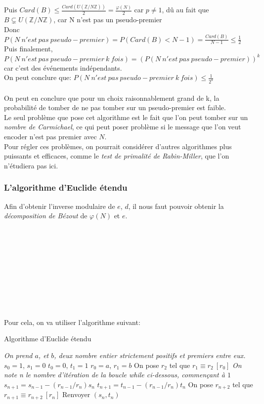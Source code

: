\documentclass[12 pt]{article}
\begin{document}
Puis $Card(B) \leq \frac{Card(U(\mathbb{Z} / N \mathbb{Z}))}{2} = \frac{\varphi(N)}{2}$ car $p \neq 1$, dû au fait que $B \subsetneq U(\mathbb{Z} / N \mathbb{Z})$, car N n'est pas un pseudo-premier\\
Donc $P(N~n'est~pas~pseudo-premier) = P(Card(B) < N-1) = \frac{Card(B)}{N-1} \leq \frac{1}{2}$\\
Puis finalement, $P(N~n'est~pas~pseudo-premier~k~fois) = (P(N~n'est~pas~pseudo-premier))^k$ car c'est des événements indépendants.\\
On peut conclure que: $P(N~n'est~pas~pseudo-premier~k~fois) \leq \frac{1}{2^k}$
\\\\
On peut en conclure que pour un choix raisonnablement grand de k, la probabilité de tomber de ne pas tomber sur un pseudo-premier est faible.\\
Le seul problème que pose cet algorithme est le fait que l'on peut tomber sur un \textit{nombre de Carmichael}, ce qui peut poser problème si le message que l'on veut encoder n'est pas premier avec $N$.\\
Pour régler ces problèmes, on pourrait considérer d'autres algorithmes plus puissants et efficaces, comme le \textit{test de primalité de Rabin-Miller}, que l'on n'étudiera pas ici.

\subsubsection{L'algorithme d'Euclide étendu}

Afin d'obtenir l'inverse modulaire de $e$, $d$, il nous faut pouvoir obtenir la \textit{décomposition de Bézout} de $\varphi(N)$ et $e$.\\\\\\\\\\\\\\\\\\\\\\
Pour cela, on va utiliser l'algorithme suivant:

\begin{algorithm}
	\caption{Algorithme d'Euclide étendu}
	\label{euclid}
	\begin{algorithmic}[1]
		\State \textit{On prend $a$, et $b$, deux nombre entier strictement positifs et premiers entre eux.}
		\State $s_0 = 1$, $s_1 = 0$
		\State $t_0 = 0$, $t_1 = 1$
		\State $r_0 = a$, $r_1 = b$
		\State On pose $r_2$ tel que $r_1 \equiv r_2~[r_0]$
		\State \textit{On note n le nombre d'itération de la boucle while ci-dessous, commençant à $1$}
		\State $s_{n+1} = s_{n-1} - (r_{n-1} / r_n)s_n$
		\State $t_{n+1} = t_{n-1} - (r_{n-1} / r_n)t_n$
		\State On pose $r_{n+2}$ tel que $r_{n+1} \equiv r_{n+2}~[r_n]$
		\EndWhile
		\State Renvoyer $(s_n, t_n)$
	\end{algorithmic}
\end{algorithm}
\end{document}
